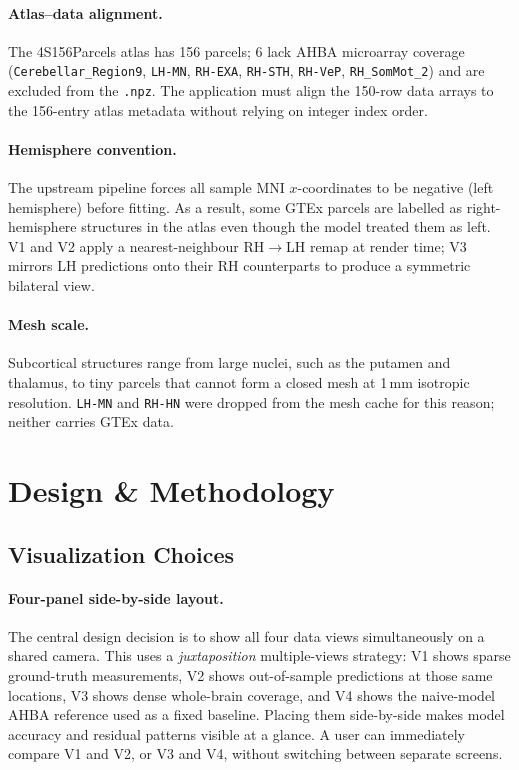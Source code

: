 \documentclass[11pt,letterpaper]{article}
\begin{document}
\paragraph{Atlas--data alignment.}
The 4S156Parcels atlas has 156 parcels; 6 lack AHBA microarray coverage
(\texttt{Cerebellar\_Region9}, \texttt{LH-MN}, \texttt{RH-EXA},
\texttt{RH-STH}, \texttt{RH-VeP}, \texttt{RH\_SomMot\_2}) and are
excluded from the \texttt{.npz}.
The application must align the 150-row data arrays to the 156-entry
atlas metadata without relying on integer index order.

\paragraph{Hemisphere convention.}
The upstream pipeline forces all sample MNI $x$-coordinates to be negative
(left hemisphere) before fitting.
As a result, some GTEx parcels are labelled as right-hemisphere structures
in the atlas even though the model treated them as left.
V1 and V2 apply a nearest-neighbour RH$\to$LH remap at render time;
V3 mirrors LH predictions onto their RH counterparts to produce a symmetric
bilateral view.

\paragraph{Mesh scale.}
Subcortical structures range from large nuclei, such as the putamen and
thalamus, to tiny parcels that cannot form a closed mesh at 1\,mm isotropic
resolution.
\texttt{LH-MN} and \texttt{RH-HN} were dropped from the mesh cache for this
reason; neither carries GTEx data.

\section{Design \& Methodology}
\label{sec:design}

\subsection{Visualization Choices}

\paragraph{Four-panel side-by-side layout.}
The central design decision is to show all four data views simultaneously
on a shared camera.
This uses a \emph{juxtaposition} multiple-views strategy:
V1 shows sparse ground-truth measurements, V2 shows out-of-sample predictions
at those same locations, V3 shows dense whole-brain coverage, and V4 shows
the naive-model AHBA reference used as a fixed baseline.
Placing them side-by-side makes model accuracy and residual patterns visible
at a glance. A user can immediately compare V1 and V2, or V3 and V4,
without switching between separate screens.
\end{document}
